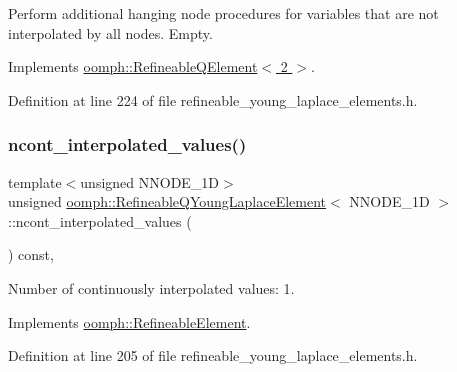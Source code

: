 Perform additional hanging node procedures for variables that are not interpolated by all nodes. Empty. 



Implements \hyperlink{classoomph_1_1RefineableQElement_3_012_01_4_a01e1eb063dd2c98ebb42d87959ca6b88}{oomph\+::\+Refineable\+Q\+Element$<$ 2 $>$}.



Definition at line 224 of file refineable\+\_\+young\+\_\+laplace\+\_\+elements.\+h.

\mbox{\label{classoomph_1_1RefineableQYoungLaplaceElement_a2bbfbab8ab058c925407a2dd8b52aaf3}} 
\subsubsection{\texorpdfstring{ncont\+\_\+interpolated\+\_\+values()}{ncont\_interpolated\_values()}}
{\footnotesize\ttfamily template$<$unsigned N\+N\+O\+D\+E\+\_\+1D$>$ \\
unsigned \hyperlink{classoomph_1_1RefineableQYoungLaplaceElement}{oomph\+::\+Refineable\+Q\+Young\+Laplace\+Element}$<$ N\+N\+O\+D\+E\+\_\+1D $>$\+::ncont\+\_\+interpolated\+\_\+values (\begin{DoxyParamCaption}{ }\end{DoxyParamCaption}) const\hspace{0.3cm}{\ttfamily [inline]}, {\ttfamily [virtual]}}



Number of continuously interpolated values\+: 1. 



Implements \hyperlink{classoomph_1_1RefineableElement_a53e171a18c9f43f1db90a6876516a073}{oomph\+::\+Refineable\+Element}.



Definition at line 205 of file refineable\+\_\+young\+\_\+laplace\+\_\+elements.\+h.

\mbox{\label{classoomph_1_1RefineableQYoungLaplaceElement_a2a24b6a44fc8c95e9648e9cd5a2a9730}} 
